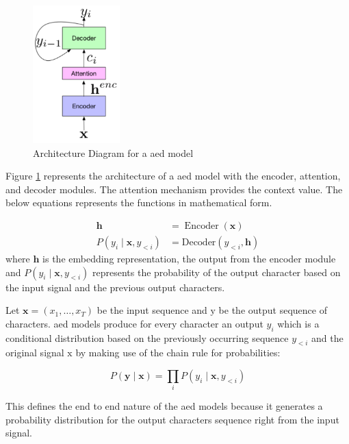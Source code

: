 \begin{figure}[ht]
  \begin{center}
    \includegraphics[width=0.3\textwidth]{images/las.png} 
    \caption{Architecture Diagram for a \acrshort{aed} model  \cite{Chiu2017State-of-the-artModels}}
    \label{fig:las}
  \end{center}
\end{figure}

Figure \ref{fig:las} represents the architecture of a \acrshort{aed} model with the encoder, attention, and decoder modules. The attention mechanism provides the context value. The below equations represents the functions in mathematical form.

$$
\begin{aligned}
\mathbf{h} &=\operatorname{Encoder}(\mathbf{x}) \\
P\left(y_{i} \mid \mathbf{x}, y_{<i}\right) &=\text {Decoder}\left(y_{<i}, \mathbf{h}\right)
\end{aligned}
$$
where $ \mathbf{h}$ is the embedding representation, the output from the encoder module and $P\left(y_{i} \mid \mathbf{x}, y_{<i}\right)$ represents the probability of the output character based on the input signal and the previous output characters.

Let $\mathbf{x}=\left(x_{1}, \ldots, x_{T}\right)$ be the input sequence and $\mathrm{y}$ be the output sequence of characters. \acrshort{aed} models produce for every character an output $y_{i}$ which is a conditional distribution based on the previously occurring sequence $y_{<i}$ and the original signal $\mathrm{x}$ by making use of the chain rule for probabilities:

$$
P(\mathbf{y} \mid \mathbf{x})=\prod_{i} P\left(y_{i} \mid \mathbf{x}, y_{<i}\right)
$$

This defines the end to end nature of the \acrshort{aed} models because it generates a probability distribution for the output characters sequence right from the input signal. 

